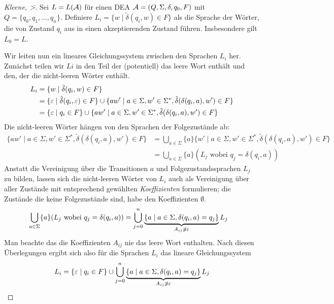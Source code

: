 \begin{proof}[Kleene, \=>]
  Sei $L=L(\mathcal{A})$ für einen \ac{DEA} $\mathcal{A}=({Q},\Sigma,\delta,q_0,F)$ mit $Q = \{q_0,q_1,\dots,q_n\}$.
        Definiere $L_i=\{ w \mid \tilde\delta(q_i,w)\in F \}$ als die Sprache der Wörter, die von Zustand $q_i$ aus in einen akzeptierenden Zustand führen.
  Insbesondere gilt $L_0 = L$.

  Wir leiten nun ein lineares Gleichungssystem zwischen den Sprachen $L_i$ her.
  Zunächst teilen wir $Li$ in den Teil der (potentiell) das leere Wort enthält und den, der die nicht-leeren Wörter enthält.
  \begin{align*}
    L_i & =  \{ w \mid \tilde\delta(q_i,w)\in F \} \\
        & =  \{ \varepsilon \mid \tilde\delta(q_i, \varepsilon) \in F \} \cup \{a w' \mid a \in \Sigma, w' \in \Sigma^*, \tilde\delta(\delta(q_i, a), w') \in F\} \\
        & =  \{ \varepsilon \mid q_i \in F \} \cup \{a w' \mid a \in \Sigma, w' \in \Sigma^*, \tilde\delta(\delta(q_i, a), w') \in F\}
    \end{align*}
    Die nicht-leeren Wörter hängen von den Sprachen der Folgezustände ab:
    \begin{align*}
      \{a w' \mid a \in \Sigma, w' \in \Sigma^*, \tilde\delta(\delta(q_i, a), w') \in F\} & =
         \bigcup_{a \in \Sigma} \{a\} \{w' \mid a \in \Sigma, w' \in \Sigma^*, \tilde\delta(\delta(q_i, a), w') \in F\}
      \\
      & = \bigcup_{a \in \Sigma} \{a\} (L_j \text{ wobei  $q_j = \delta(q_i, a)$}) 
    \end{align*}
    Anstatt die Vereinigung über die Transitionen $a$ und Folgezustandssprachen $L_j$ zu bilden, lassen sich die nicht-leeren Wörter von $L_i$ auch als Vereinigung über aller Zustände mit entsprechend gewählten \emph{Koeffizienten} formulieren; die Zustände die keine Folgezustände sind, habe den Koeffizienten $\emptyset$.
    \begin{align*}
      \bigcup_{a \in \Sigma} \{a\} (L_j \text{ wobei  $q_j = \delta(q_i, a)$}) & = \bigcup_{j = 0}^{n} \underbrace{\{a \mid a \in \Sigma, \delta(q_i, a) = q_j\}}_{A_{ij} \not \ni \varepsilon} L_j
    \end{align*}
    Man beachte das die Koeffizienten $A_{ij}$ nie das leere Wort enthalten.
    Nach diesen Überlegungen ergibt sich also für die Sprachen $L_i$ das lineare Gleichungssystem
    \begin{displaymath}
      L_i = \{ \Eps \mid q_i \in F \} \cup \bigcup_{j = 0}^{n} \underbrace{\{a \mid a \in \Sigma, \delta(q_i, a) = q_j\}}_{A_{ij} \not \ni \Eps} L_j

\end{displaymath}
\end{proof}
